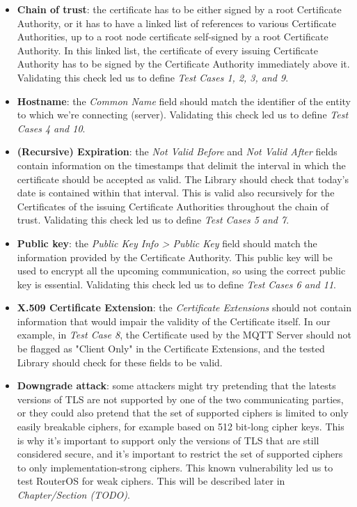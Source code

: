 \documentclass[binding=0.6cm,noexaminfo]{sapthesis}
\begin{document}
\begin{itemize}
	\item \textbf{Chain of trust}: the certificate has to be either signed by a root Certificate Authority, or it has to have a linked list of references to various Certificate Authorities, up to a root node certificate self-signed by a root Certificate Authority. In this linked list, the certificate of every issuing Certificate Authority has to be signed by the Certificate Authority immediately above it. Validating this check led us to define \textit{Test Cases 1, 2, 3, and 9}.
	\item \textbf{Hostname}: the \textit{Common Name} field should match the identifier of the entity to which we’re connecting (server). Validating this check led us to define \textit{Test Cases 4 and 10}.
	\item \textbf{(Recursive) Expiration}: the \textit{Not Valid Before} and \textit{Not Valid After} fields contain information on the timestamps that delimit the interval in which the certificate should be accepted as valid. The Library should check that today's date is contained within that interval. This is valid also recursively for the Certificates of the issuing Certificate Authorities throughout the chain of trust. Validating this check led us to define \textit{Test Cases 5 and 7}.
	\item \textbf{Public key}: the \textit{Public Key Info > Public Key} field should match the information provided by the Certificate Authority. This public key will be used to encrypt all the upcoming communication, so using the correct public key is essential. Validating this check led us to define \textit{Test Cases 6 and 11}.
	\item \textbf{X.509 Certificate Extension}: the \textit{Certificate Extensions} should not contain information that would impair the validity of the Certificate itself. In our example, in \textit{Test Case 8}, the Certificate used by the MQTT Server should not be flagged as "Client Only" in the Certificate Extensions, and the tested Library should check for these fields to be valid.
	\item \textbf{Downgrade attack}: some attackers might try pretending that the latests versions of TLS are not supported by one of the two communicating parties, or they could also pretend that the set of supported ciphers is limited to only easily breakable ciphers, for example based on 512 bit-long cipher keys. This is why it’s important to support only the versions of TLS that are still considered secure, and it’s important to restrict the set of supported ciphers to only implementation-strong ciphers. This known vulnerability led us to test RouterOS for weak ciphers. This will be described later in \textit{Chapter/Section (TODO)}.
\end{itemize}
\end{document}
